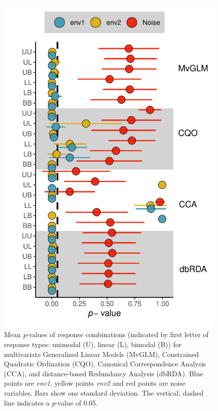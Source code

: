 \documentclass[a4paper,11pt]{article}
\begin{document}
    \begin{figure}
        \centering
        \includegraphics[scale = 0.7]{figures/190912_error_bar.pdf}
        \caption{Mean \textit{p}-values of response combinations (indicated by first letter of response types: unimodal (U), linear (L), bimodal (B)) for multivariate Generalized Linear Models (MvGLM), Constrained Quadratic Ordination (CQO), Canonical Correspondence Analysis (CCA), and distance-based Redundancy Analysis (dbRDA). Blue points are \textit{env1}, yellow points \textit{env2} and red points are noise variables. Bars show one standard deviation. The vertical, dashed line indicates a \textit{p}-value of 0.05.}
        \label{fig:result1::p-valueComparison}
    \end{figure}
\end{document}
